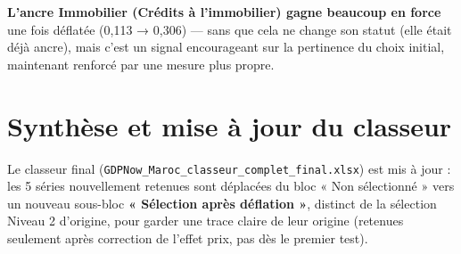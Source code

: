 \documentclass[11pt,a4paper]{article}
\begin{document}
\begin{noteboxbleu}
\textbf{L'ancre Immobilier (Crédits à l'immobilier) gagne beaucoup en force} une fois déflatée (0,113 → 0,306) --- sans que cela ne change son statut (elle était déjà ancre), mais c'est un signal encourageant sur la pertinence du choix initial, maintenant renforcé par une mesure plus propre.
\end{noteboxbleu}

\section{Synthèse et mise à jour du classeur}

\begin{fichebox}
Le classeur final (\texttt{GDPNow\_Maroc\_classeur\_complet\_final.xlsx}) est mis à jour : les 5 séries nouvellement retenues sont déplacées du bloc « Non sélectionné » vers un nouveau sous-bloc \textbf{« Sélection après déflation »}, distinct de la sélection Niveau 2 d'origine, pour garder une trace claire de leur origine (retenues seulement après correction de l'effet prix, pas dès le premier test).
\end{fichebox}
\end{document}
